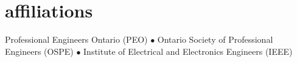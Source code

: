 
\section{affiliations}
  \vspace{-0.2cm}

Professional Engineers Ontario (PEO) $\bullet$ Ontario Society of Professional Engineers (OSPE) $\bullet$ Institute of Electrical and Electronics Engineers (IEEE)